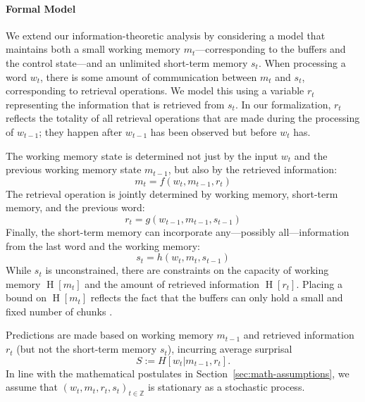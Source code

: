 \documentclass[11pt,letterpaper]{article}
\begin{document}
\paragraph{Formal Model}
We extend our information-theoretic analysis by considering a model that maintains both a small working memory $m_t$---corresponding to the buffers and the control state---and an unlimited short-term memory $s_t$.
When processing a word $w_t$, there is some amount of communication between $m_t$ and $s_t$, corresponding to retrieval operations.
We model this using a variable $r_t$ representing the information that is retrieved from $s_t$.
In our formalization, $r_t$ reflects the totality of all retrieval operations that are made during the processing of $w_{t-1}$; they happen after $w_{t-1}$ has been observed but before $w_t$ has.

The working memory state is determined not just by the input $w_t$ and the previous working memory state $m_{t-1}$, but also by the retrieved information:
\begin{equation}
	m_t = f(w_t, m_{t-1}, r_t) 
\end{equation}
The retrieval operation is jointly determined by working memory, short-term memory, and the previous word:
\begin{equation}\label{eq:rt}
	r_t = g(w_{t-1}, m_{t-1}, s_{t-1}) 
\end{equation}
Finally, the short-term memory can incorporate any---possibly all---information from the last word and the working memory:
\begin{equation}
	s_t = h(w_{t}, m_{t}, s_{t-1}) 
\end{equation}
While $s_t$ is unconstrained, there are constraints on the capacity of working memory $\operatorname{H}[m_t]$ and the amount of retrieved information $\operatorname{H}[r_t]$.
Placing a bound on $\operatorname{H}[m_t]$ reflects the fact that the buffers can only hold a small and fixed number of chunks \citep{lewis-activation-based-2005}.

Predictions are made based on working memory $m_{t-1}$ and retrieved information $r_t$ (but not the short-term memory $s_t$), incurring average surprisal
\begin{equation}
    S := H[w_t| m_{t-1}, r_t].
\end{equation}
In line with the mathematical postulates in Section~\ref{sec:math-assumptions}, we assume that $(w_t, m_t, r_t, s_t)_{t \in \mathbb{Z}}$ is stationary as a stochastic process.
\end{document}

